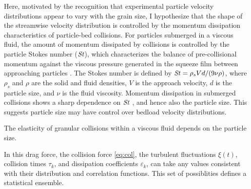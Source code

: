 Here, motivated by the recognition that experimental particle velocity distributions appear to vary with the grain size, I hypothesize that the shape of the streamwise velocity distribution is controlled by the momentum dissipation characteristics of particle-bed collisions.
For particles submerged in a viscous fluid, the amount of momentum dissipated by collisions is controlled by the particle Stokes number ($\mbox{\textit{St}}$), which characterizes the balance of pre-collisional momentum against the viscous pressure generated in the squeeze film between approaching particles \citep{}. The Stokes number is defined by $\mbox{\textit{St}} = \rho_s V d/(9\nu \rho)$, where $\rho_s$ and $\rho$ are the solid and fluid densities, $V$ is the approach velocity, $d$ is the particle size, and $\nu$ is the fluid viscosity. Momentum dissipation in submerged collisions shows a sharp dependence on $\mbox{\textit{St}}$ \citep{Joseph2001, Schmeeckle2001}, and hence also the particle size. This suggests particle size may have control over bedload velocity distributions.


The elasticity of granular collisions within a viscous fluid depends on the particle size.



In this drag force, the collision force \ref{eq:col}, the turbulent fluctuations $\xi(t)$, collision times $\tau_k$, and dissipation coefficients $\varepsilon_k$, can take any values consistent with their distribution and correlation functions. This set of possiblities defines a statistical ensemble.
